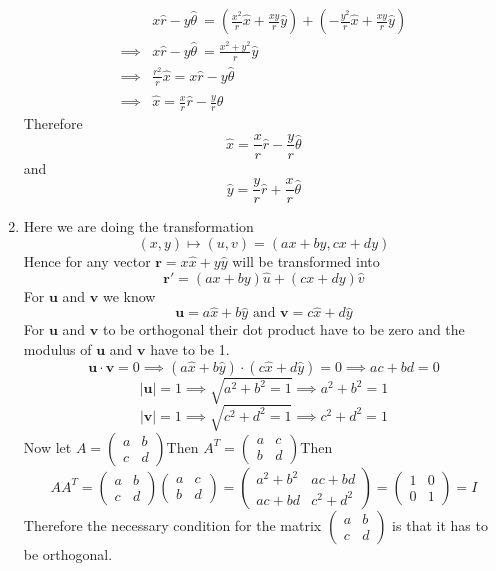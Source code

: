 \documentclass{article}
\begin{document}
\begin{enumerate}
\begin{align*}
	&x\hat{r}-y\hat{\theta}\ =(\frac{x^2}{r}\hat{x}+\frac{xy}{r}\hat{y})+(-\frac{y^2}{r}\hat{x}+\frac{xy}{r}\hat{y})\\
	\implies&x\hat{r}-y\hat{\theta}\ =\frac{x^2+y^2}{r}\hat{y}\\
	\implies & \frac{r^2}{r}\hat{x}=x\hat{r}-y\hat{\theta}\\
	\implies & \hat{x}=\frac{x}{r}\hat{r}-\frac{y}{r}\hat{\theta}
\end{align*}Therefore$$\hat{x}=\frac{x}{r}\hat{r}-\frac{y}{r}\hat{\theta}$$ and $$\hat{y}=\frac{y}{r}\hat{r}+\frac{x}{r}\hat{\theta}$$
\pagebreak
\item Here we are doing the transformation $$(x,y)\mapsto(u,v)=(ax+by,cx+dy)$$Hence for any vector $\boldsymbol{r}=x\hat{x}+y\hat{y}$ will be transformed into$$\boldsymbol{r}'=(ax+by)\hat{u}+(cx+dy)\hat{v}$$For $\boldsymbol{u}$ and $\boldsymbol{v}$ we know$$\boldsymbol{u}=a\hat{x}+b\hat{y}\text{ and }\boldsymbol{v}=c\hat{x}+d\hat{y}$$For $\boldsymbol{u}$ and $\boldsymbol{v}$ to be orthogonal their dot product have to be zero and the modulus of $\boldsymbol{u}$ and $\boldsymbol{v}$ have to be 1.
$$\boldsymbol{u}\cdot\boldsymbol{v}=0\implies(a\hat{x}+b\hat{y})\cdot(c\hat{x}+d\hat{y})=0\implies ac+bd=0$$ $$|\boldsymbol{u}|=1\implies\sqrt{a^2+b^2=1}\implies a^2+b^2=1$$ $$|\boldsymbol{v}|=1\implies\sqrt{c^2+d^2=1}\implies c^2+d^2=1$$Now let $A=\begin{pmatrix}
	a & b\\
	c&d
\end{pmatrix}$Then $A^T=\begin{pmatrix}
a&c\\
b&d
\end{pmatrix}$Then $$AA^T=\begin{pmatrix}
a & b\\
c&d
\end{pmatrix}\begin{pmatrix}
a&c\\
b&d
\end{pmatrix}=\begin{pmatrix}
a^2+b^2&ac+bd\\
ac+bd&c^2+d^2
\end{pmatrix}=\begin{pmatrix}
1&0\\
0&1
\end{pmatrix}=I$$Therefore the necessary condition for the matrix $\begin{pmatrix}
a & b\\
c&d
\end{pmatrix}$ is that it has to be orthogonal.

\end{enumerate}
\end{document}
